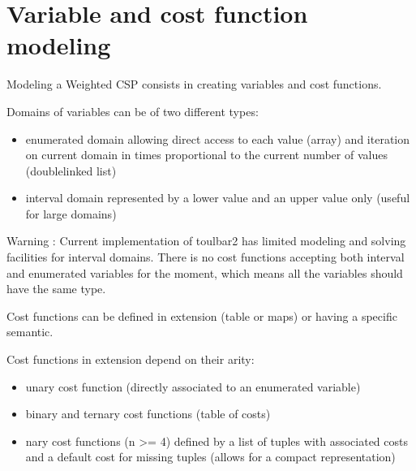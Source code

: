 \documentclass[letterpaper,10pt,openany,oneside,english]{sphinxmanual}
\begin{document}
\section{Variable and cost function modeling}
\label{\detokenize{ref/ref_modules:variable-and-cost-function-modeling}}

\begin{fulllineitems}

\pysigstartsignatures
{}
\pysigstopsignatures
\sphinxAtStartPar

\sphinxAtStartPar
Modeling a Weighted CSP consists in creating variables and cost functions.

\sphinxAtStartPar
Domains of variables can be of two different types:
\begin{itemize}
\item {} 
\sphinxAtStartPar
enumerated domain allowing direct access to each value (array) and iteration on current domain in times proportional to the current number of values (double\sphinxhyphen{}linked list)

\item {} 
\sphinxAtStartPar
interval domain represented by a lower value and an upper value only (useful for large domains)

\end{itemize}

Warning : Current implementation of toulbar2 has limited modeling and solving facilities for interval domains. There is no cost functions accepting both interval and enumerated variables for the moment, which means all the variables should have the same type.

\sphinxAtStartPar

\sphinxAtStartPar
Cost functions can be defined in extension (table or maps) or having a specific semantic.

\sphinxAtStartPar
Cost functions in extension depend on their arity:
\begin{itemize}
\item {} 
\sphinxAtStartPar
unary cost function (directly associated to an enumerated variable)

\item {} 
\sphinxAtStartPar
binary and ternary cost functions (table of costs)

\item {} 
\sphinxAtStartPar
n\sphinxhyphen{}ary cost functions (n \textgreater{}= 4) defined by a list of tuples with associated costs and a default cost for missing tuples (allows for a compact representation)


\end{itemize}
\end{fulllineitems}
\end{document}
